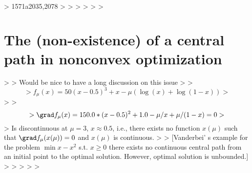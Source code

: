 > 
1571a2035,2078
> 
> 
> 
> \if{}
> 
> \section{The (non-existence) of a central path in nonconvex optimization}\label{app:non-existence-of-central-path}
> 
> Would be nice to have a long discussion on this issue
> 
> $$
> f_{\mu}(x) = 50 (x - 0.5)^3 + x - \mu (\log(x) + \log(1 - x))
> $$
> 
> $$
> \grad f_{\mu}(x) = 150.0 * (x - 0.5)^2 + 1.0  - \mu / x + \mu / (1 - x) = 0 \\
> $$
> Is discontinuous at $\mu = 3$, $x \approx 0.5$, i.e., there exists no function $x(\mu)$ such that $\grad f_{\mu}(x(\mu)) = 0$ and $x(\mu)$ is continuous. 
> 
> [Vanderbei' s example for the problem $\min{ x -x^2}$ s.t. $x \ge 0$ there exists no continuous central path from an initial point to the optimal solution. However, optimal solution is unbounded.]
> 
> \fi
> 
> 
> 
